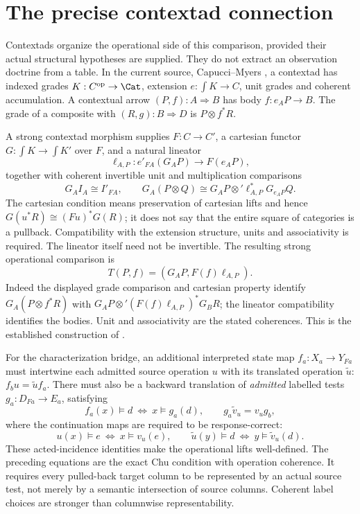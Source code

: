 \section{The precise contextad connection}\label{sec:contextads}
Contextads organize the operational side of this comparison, provided their
actual structural hypotheses are supplied. They do not extract an
observation doctrine from a table. In the current source, Capucci--Myers
\cite[Definition 5.25, Examples 5.33--5.35]{CM2}, a contextad has indexed
grades $K:C^{\mathrm{op}}\to\Cat$, extension $e:\int K\to C$,
unit grades and coherent accumulation. A contextual arrow $(P,f):A\Rightarrow B$
has body $f:e_AP\to B$. The grade of a composite with $(R,g):B\Rightarrow D$
is $P\otimes f^*R$.

A strong contextad morphism supplies $F:C\to C'$, a cartesian functor
$G:\int K\to\int K'$ over $F$, and a natural lineator
\[
 \ell_{A,P}:e'_{FA}(G_AP)\longrightarrow F(e_AP),
\]
together with coherent invertible unit and multiplication comparisons
\[
 G_AI_A\cong I'_{FA},\qquad
 G_A(P\otimes Q)\cong
 G_AP\otimes'\ell_{A,P}^*G_{e_AP}Q.
\]
The cartesian condition means preservation of cartesian lifts and hence
$G(u^*R)\cong(Fu)^*G(R)$; it does not say that the entire square of
categories is a pullback. Compatibility with the extension structure,
units and associativity is required. The lineator itself need not be
invertible. The resulting strong operational comparison is
\[
 T(P,f)=(G_AP,F(f)\ell_{A,P}).
\]
Indeed the displayed grade comparison and cartesian property identify
$G_A(P\otimes f^*R)$ with
$G_AP\otimes'(F(f)\ell_{A,P})^*G_BR$; the lineator compatibility
identifies the bodies. Unit and associativity are the stated coherences.
This is the established construction of \cite[equations (5.6.20)--(5.6.21)]{CM2}.

For the characterization bridge, an additional interpreted state map
$f_a:X_a\to Y_{Fa}$ must intertwine each admitted source operation $u$
with its translated operation $\widetilde u$:
$f_bu=\widetilde u f_a$. There must also be a backward translation of
\emph{admitted} labelled tests $g_a:D_{Fa}\to E_a$, satisfying
\[
 f_a(x)\models d\ \Longleftrightarrow\ x\models g_a(d),
 \qquad g_a\widetilde v_u=v_ug_b,
\]
where the continuation maps are required to be response-correct:
\[
 u(x)\models e\ \Longleftrightarrow\ x\models v_u(e),\qquad
 \widetilde u(y)\models d\ \Longleftrightarrow\ y\models\widetilde v_u(d).
\]
These acted-incidence identities make the operational lifts well-defined.
The preceding equations are the exact Chu condition with operation coherence.
It requires every pulled-back target column to be represented by an
actual source test, not merely by a semantic intersection of source columns.
Coherent label choices are stronger than columnwise representability.


